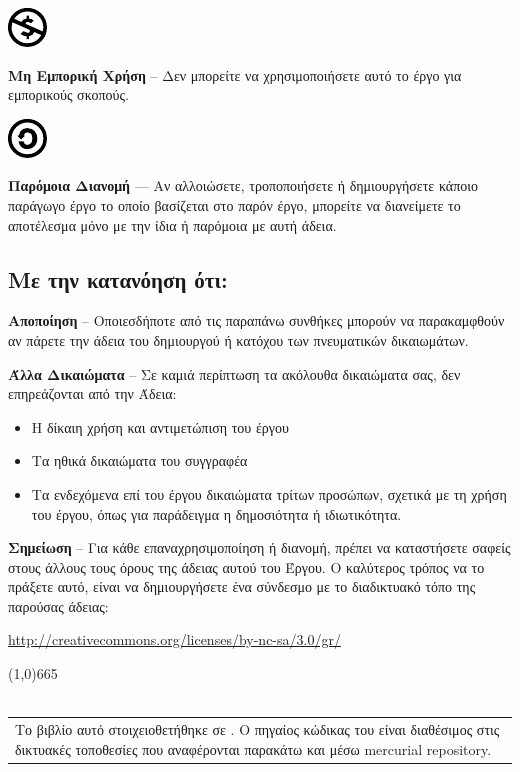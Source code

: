 \vspace{1em}
\noindent
\parbox{1.5cm}{\includegraphics[scale=1.5]{images/license/cc_nc_30}}
\parbox{10.5cm}{\textbf{Μη Εμπορική Χρήση} --  Δεν μπορείτε να χρησιμοποιήσετε αυτό το έργο για εμπορικούς σκοπούς.}

\vspace{1em}
\noindent
\parbox{1.5cm}{\includegraphics[scale=1.5]{images/license/cc_sa_30}}
\parbox{10.5cm}{\textbf{Παρόμοια Διανομή}  — Αν αλλοιώσετε, τροποποιήσετε ή δημιουργήσετε κάποιο παράγωγο έργο το οποίο βασίζεται στο παρόν έργο, μπορείτε να διανείμετε το αποτέλεσμα μόνο με την ίδια ή παρόμοια με αυτή άδεια.}

\subsection*{Με την κατανόηση ότι:}

\noindent
\textbf{Αποποίηση} -- Οποιεσδήποτε από τις παραπάνω συνθήκες μπορούν να παρακαμφθούν αν πάρετε την άδεια του δημιουργού ή κατόχου των πνευματικών δικαιωμάτων.

\vspace{1em}
\noindent
\textbf{Άλλα Δικαιώματα} -- Σε καμιά περίπτωση τα ακόλουθα δικαιώματα σας, δεν επηρεάζονται από την Άδεια:

\begin{itemize}
  \item Η δίκαιη χρήση και αντιμετώπιση του έργου
  \item Τα ηθικά δικαιώματα του συγγραφέα
  \item Τα ενδεχόμενα επί του έργου δικαιώματα τρίτων προσώπων, σχετικά με τη χρήση του έργου, όπως για παράδειγμα η δημοσιότητα ή ιδιωτικότητα.
\end{itemize}

\vspace{1em}
\noindent
\textbf{Σημείωση} -- Για κάθε επαναχρησιμοποίηση ή διανομή, πρέπει να καταστήσετε σαφείς στους άλλους τους όρους της άδειας αυτού του Έργου. Ο καλύτερος τρόπος να το πράξετε αυτό, είναι να δημιουργήσετε ένα σύνδεσμο με το διαδικτυακό τόπο της παρούσας άδειας:
\begin{center}
\url{http://creativecommons.org/licenses/by-nc-sa/3.0/gr/}
\end{center}
\line(1,0){665}\\\\
\begin{tabular}{p{}}
Το βιβλίο αυτό στοιχειοθετήθηκε σε \XeLaTeX{}.  Ο πηγαίος κώδικας του είναι διαθέσιμος στις δικτυακές τοποθεσίες που αναφέρονται παρακάτω και μέσω mercurial repository.\\
\end{tabular}

